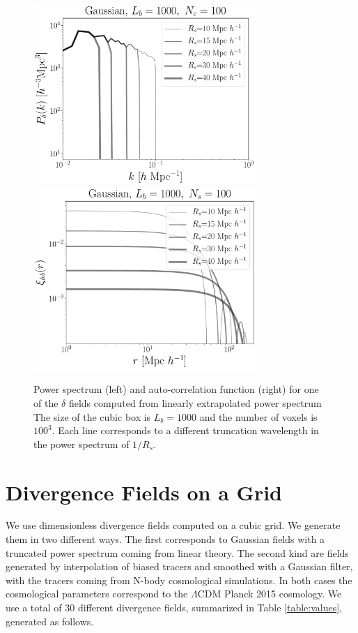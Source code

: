 \documentclass[usenatbib]{mnras}
\begin{document}
\begin{figure}
    \centering
    \includegraphics[width=240pt]{power_spectrum_gauss_1000_100.pdf}
    \includegraphics[width=240pt]{corr_func_gauss_1000_100.pdf}
    \caption{Power spectrum (left) and auto-correlation function (right) for one of the $\delta$ fields computed from linearly extrapolated power spectrum
    The size of the cubic box is $L_b=1000$ \hMpc and the number of voxels is $100^3$.
    Each line corresponds to a different truncation wavelength in the power spectrum of $1/R_s$.}
    \label{fig:gaussian}
\end{figure}


\section{Divergence Fields on a Grid}
\label{sec:numerical_setup}

We use dimensionless divergence fields computed on a cubic grid. 
We generate them in two different ways.
The first corresponds to Gaussian fields with a truncated power spectrum coming from linear theory.
The second kind are fields generated by interpolation of biased tracers and smoothed with a Gaussian filter, with the tracers coming from N-body cosmological simulations.
In both cases the cosmological parameters correspond to the
$\Lambda$CDM Planck 2015 cosmology. 
We use a total of $30$ different divergence fields, summarized in Table \ref{table:values}, generated as follows.
\end{document}
